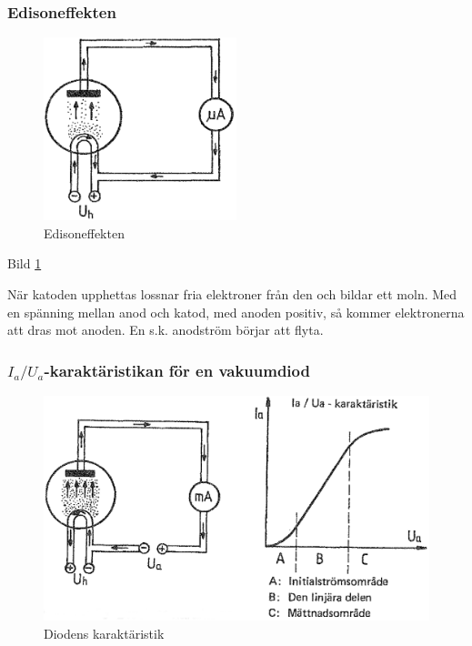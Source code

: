 \subsubsection{Edisoneffekten}

\begin{figure}
\includegraphics[width=0.5\textwidth]{images/cropped_pdfs/bild_2_2-25.pdf}
\caption{Edisoneffekten}
\label{fig:BildII2-25}
\end{figure}

Bild \ref{fig:BildII2-25}

När katoden upphettas lossnar fria elektroner från den och bildar ett moln. Med
en spänning mellan anod och katod, med anoden positiv, så kommer elektronerna
att dras mot anoden. En s.k. anodström börjar att flyta.

\subsubsection{\(I_a/U_a\)-karaktäristikan för en vakuumdiod}

\begin{figure}
\includegraphics[width=\textwidth]{images/cropped_pdfs/bild_2_2-26.pdf}
\caption{Diodens karaktäristik}
\label{fig:BildII2-26}
\end{figure}

